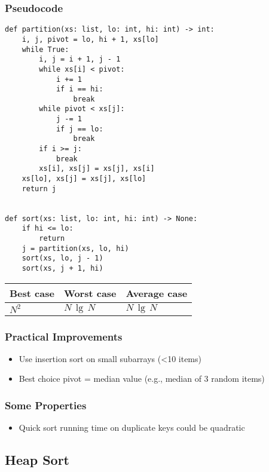 \documentclass[a4paper]{article}
\begin{document}
\subsubsection*{Pseudocode}
\begin{lstlisting}
def partition(xs: list, lo: int, hi: int) -> int:
    i, j, pivot = lo, hi + 1, xs[lo]
    while True:
        i, j = i + 1, j - 1
        while xs[i] < pivot:
            i += 1
            if i == hi:
                break
        while pivot < xs[j]:
            j -= 1
            if j == lo:
                break
        if i >= j:
            break
        xs[i], xs[j] = xs[j], xs[i]
    xs[lo], xs[j] = xs[j], xs[lo]
    return j


def sort(xs: list, lo: int, hi: int) -> None:
    if hi <= lo:
        return
    j = partition(xs, lo, hi)
    sort(xs, lo, j - 1)
    sort(xs, j + 1, hi)
\end{lstlisting}
\begin{spacing}{1.5}
\begin{tabularx}{1\textwidth}{|X|X|X|}
    \hline
    \textbf{Best case} & \textbf{Worst case} & \textbf{Average case}\\
    \hline
    $N^2$&$N\,\lg\,N$&$N\,\lg\,N$\\
    \hline
\end{tabularx}
\end{spacing}

\subsubsection*{Practical Improvements}
\begin{itemize}
    \item Use insertion sort on small subarrays (<10 items)
    \item Best choice pivot = median value (e.g., median of 3 random items)
\end{itemize}

\subsubsection*{Some Properties}
\begin{itemize}
    \item Quick sort running time on duplicate keys could be quadratic
\end{itemize}

\subsection{Heap Sort}
\end{document}
